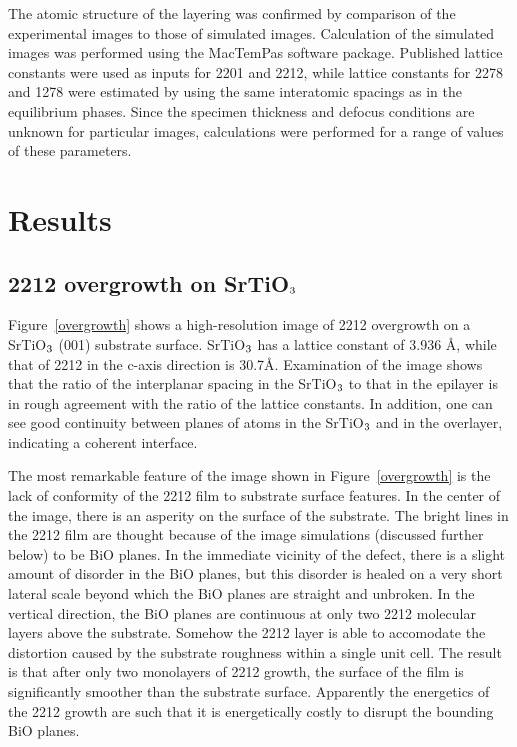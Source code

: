 The atomic structure of the layering was confirmed by comparison of
the experimental images to those of simulated images.  Calculation of
the simulated images was performed using the MacTemPas software
package.\cite{mactempas} Published lattice constants were used as
inputs for 2201 and 2212, while lattice constants for 2278 and 1278
were estimated by using the same interatomic spacings as in the
equilibrium phases.  Since the specimen thickness and defocus
conditions are unknown for particular images, calculations were
performed for a range of values of these parameters.

\section{Results}

\subsection{2212 overgrowth on SrTiO$\rm _3$}

Figure~\ref{overgrowth} shows a high-resolution image of 2212
overgrowth on a SrTiO$\rm _3$ (001) substrate surface.  SrTiO$\rm _3$
has a lattice constant of 3.936 \AA, while that of 2212 in the c-axis
direction is 30.7\AA.\cite{torrance,sunshine} Examination of the image
shows that the ratio of the interplanar spacing in the SrTiO$\rm _3$
to that in the epilayer is in rough agreement with the ratio of the
lattice constants.  In addition, one can see good continuity between
planes of atoms in the SrTiO$\rm _3$ and in the overlayer, indicating
a coherent interface.

The most remarkable feature of the image shown in
Figure~\ref{overgrowth} is the lack of conformity of the 2212 film to
substrate surface features.  In the center of the image, there is an
asperity on the surface of the substrate.  The bright lines in the
2212 film are thought because of the image simulations (discussed
further below) to be BiO planes.  In the immediate vicinity of the
defect, there is a slight amount of disorder in the BiO planes, but
this disorder is healed on a very short lateral scale beyond which the
BiO planes are straight and unbroken.  In the vertical direction, the
BiO planes are continuous at only two 2212 molecular layers above the
substrate.  Somehow the 2212 layer is able to accomodate the
distortion caused by the substrate roughness within a single unit
cell.  The result is that after only two monolayers of 2212 growth,
the surface of the film is significantly smoother than the substrate
surface.  Apparently the energetics of the 2212 growth are such that
it is energetically costly to disrupt the bounding BiO planes.

